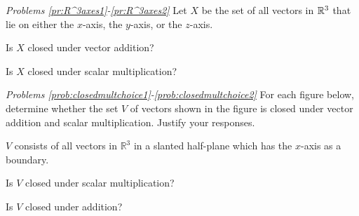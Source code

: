 \documentclass{ximera}
\begin{document}
\emph{Problems \ref{pr:R^3axes1}-\ref{pr:R^3axes2}}
 Let $X$ be the set of all vectors in $\mathbb{R}^3$ that lie on either the $x$-axis, the $y$-axis, or the $z$-axis.    
 
 	\begin{problem}\label{pr:R^3axes1}
  Is $X$ closed under vector addition?
  
  \begin{multipleChoice}
 \end{multipleChoice}
 
 	\end{problem}
 	\begin{problem}\label{pr:R^3axes2}
 Is $X$ closed under scalar multiplication?
 
 \begin{multipleChoice}
 \end{multipleChoice}
 	\end{problem}


\emph{Problems \ref{prob:closedmultchoice1}-\ref{prob:closedmultchoice2}}
For each figure below, determine whether the set $V$ of vectors shown in the figure is closed under vector addition and scalar multiplication.  Justify your responses.
  
\begin{problem}\label{prob:closedmultchoice1} 
$V$ consists of all vectors in $\mathbb{R}^3$ in a slanted half-plane which has the $x$-axis as a boundary.


Is $V$ closed under scalar multiplication?
 
 \begin{multipleChoice}
 \end{multipleChoice}
 
 Is $V$ closed under addition?
 
 \begin{multipleChoice}
 \end{multipleChoice}
\end{problem}
\end{document}
